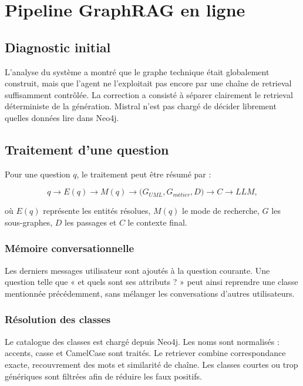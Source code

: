 \chapter{Pipeline GraphRAG en ligne}

\section{Diagnostic initial}

L'analyse du système a montré que le graphe technique était globalement construit, mais que l'agent ne l'exploitait pas encore par une chaîne de retrieval suffisamment contrôlée. La correction a consisté à séparer clairement le retrieval déterministe de la génération. Mistral n'est pas chargé de décider librement quelles données lire dans Neo4j.

\section{Traitement d'une question}

Pour une question $q$, le traitement peut être résumé par :

\begin{equation}
q\rightarrow E(q)\rightarrow M(q)\rightarrow
\bigl(G_{UML},G_{métier},D\bigr)\rightarrow C\rightarrow LLM,
\end{equation}

où $E(q)$ représente les entités résolues, $M(q)$ le mode de recherche, $G$ les sous-graphes, $D$ les passages et $C$ le contexte final.

\subsection{Mémoire conversationnelle}

Les derniers messages utilisateur sont ajoutés à la question courante. Une question telle que « et quels sont ses attributs ? » peut ainsi reprendre une classe mentionnée précédemment, sans mélanger les conversations d'autres utilisateurs.

\subsection{Résolution des classes}

Le catalogue des classes est chargé depuis Neo4j. Les noms sont normalisés : accents, casse et CamelCase sont traités. Le retriever combine correspondance exacte, recouvrement des mots et similarité de chaîne. Les classes courtes ou trop génériques sont filtrées afin de réduire les faux positifs.

